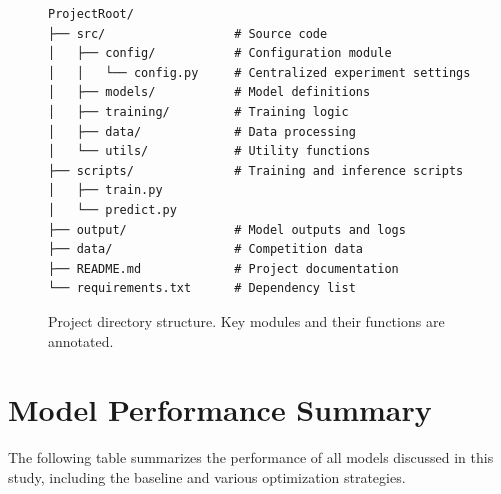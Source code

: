 \documentclass[12pt]{article}
\begin{document}
\begin{figure}[H]
\centering
\begin{mdframed}[linewidth=1pt, roundcorner=5pt]
\begin{verbatim}
ProjectRoot/
├── src/                  # Source code
│   ├── config/           # Configuration module
│   │   └── config.py     # Centralized experiment settings
│   ├── models/           # Model definitions
│   ├── training/         # Training logic
│   ├── data/             # Data processing
│   └── utils/            # Utility functions
├── scripts/              # Training and inference scripts
│   ├── train.py
│   └── predict.py
├── output/               # Model outputs and logs
├── data/                 # Competition data
├── README.md             # Project documentation
└── requirements.txt      # Dependency list
\end{verbatim}
\end{mdframed}
\caption{Project directory structure. Key modules and their functions are annotated.}
\label{fig:project-structure}
\end{figure}


\section{Model Performance Summary}
\label{app:model_performance}
The following table summarizes the performance of all models discussed in this study, including the baseline and various optimization strategies.
\end{document}
